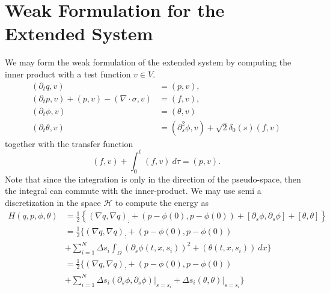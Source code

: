 \documentclass[12pt]{article}
\begin{document}
\section{Weak Formulation for the Extended System}
We may form the weak formulation of the extended system by computing the inner product with a test function $v \in V$.
\begin{equation}
\begin{aligned}
	(\partial_{t} q, v) &= ( p,v ), \\
	(\partial_{t} p,v) + (p,v) - (\nabla\cdot \sigma,v) &= (f,v), \\
	(\partial_{t} \phi,v) &= (\theta,v) \\
	(\partial_t \theta , v) &= (\partial^2_s \phi,v) + \sqrt 2 \delta_0(s) (f,v)
\end{aligned}
\end{equation}
together with the transfer function
\begin{equation}
	(f,v) + \int_0^t(f,v) \ d\tau = (p,v).
\end{equation}
Note that since the integration is only in the direction of the pseudo-space, then the integral can commute with the inner-product. We may use semi a discretization in the space $\mathcal H$ to compute the energy as
\begin{equation}
\begin{aligned}
	H(q,p,\phi,\theta) & = \frac 1 2 \left\{ (\nabla q, \nabla q)_: + (p-\phi(0),p-\phi(0)) + [\partial_{s}\phi,\partial_{s}\phi] +  [\theta,\theta]\right\} \\
	&= \frac 1 2 \big\{ (\nabla q, \nabla q)_: + (p-\phi(0),p-\phi(0)) \\
	&+ \sum_{i=1}^{N} \Delta s_i \int_{\Omega} (\partial_{s}\phi(t,x,s_i))^2 +  (\theta(t,x,s_i)) \ dx \big\} \\
	&= \frac 1 2 \big\{ (\nabla q, \nabla q)_: + (p-\phi(0),p-\phi(0)) \\
	&+ \sum_{i=1}^{N} \Delta s_i (\partial_{s}\phi,\partial_{s}\phi)\big|_{s=s_i} + \Delta s_i(\theta,\theta)\big|_{s=s_i} \big\}
\end{aligned}
\end{equation}
\end{document}
